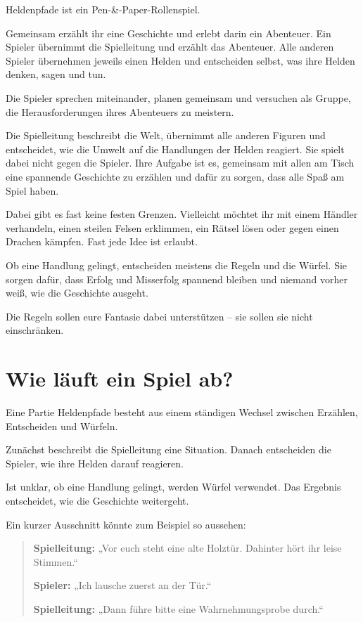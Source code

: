 Heldenpfade ist ein Pen-\&-Paper-Rollenspiel.

Gemeinsam erzählt ihr eine Geschichte und erlebt darin ein Abenteuer. Ein Spieler übernimmt die Spielleitung und erzählt das Abenteuer. Alle anderen Spieler übernehmen jeweils einen Helden und entscheiden selbst, was ihre Helden denken, sagen und tun.

Die Spieler sprechen miteinander, planen gemeinsam und versuchen als Gruppe, die Herausforderungen ihres Abenteuers zu meistern.

Die Spielleitung beschreibt die Welt, übernimmt alle anderen Figuren und entscheidet, wie die Umwelt auf die Handlungen der Helden reagiert. Sie spielt dabei nicht gegen die Spieler. Ihre Aufgabe ist es, gemeinsam mit allen am Tisch eine spannende Geschichte zu erzählen und dafür zu sorgen, dass alle Spaß am Spiel haben.

Dabei gibt es fast keine festen Grenzen. Vielleicht möchtet ihr mit einem Händler verhandeln, einen steilen Felsen erklimmen, ein Rätsel lösen oder gegen einen Drachen kämpfen. Fast jede Idee ist erlaubt.

Ob eine Handlung gelingt, entscheiden meistens die Regeln und die Würfel. Sie sorgen dafür, dass Erfolg und Misserfolg spannend bleiben und niemand vorher weiß, wie die Geschichte ausgeht.

Die Regeln sollen eure Fantasie dabei unterstützen -- sie sollen sie nicht einschränken.

\section{Wie läuft ein Spiel ab?}

Eine Partie Heldenpfade besteht aus einem ständigen Wechsel zwischen Erzählen, Entscheiden und Würfeln.

Zunächst beschreibt die Spielleitung eine Situation. Danach entscheiden die Spieler, wie ihre Helden darauf reagieren.

Ist unklar, ob eine Handlung gelingt, werden Würfel verwendet. Das Ergebnis entscheidet, wie die Geschichte weitergeht.

Ein kurzer Ausschnitt könnte zum Beispiel so aussehen:

\begin{quote}
\textbf{Spielleitung:} „Vor euch steht eine alte Holztür. Dahinter hört ihr leise Stimmen.“

\textbf{Spieler:} „Ich lausche zuerst an der Tür.“

\textbf{Spielleitung:} „Dann führe bitte eine Wahrnehmungsprobe durch.“
\end{quote}

